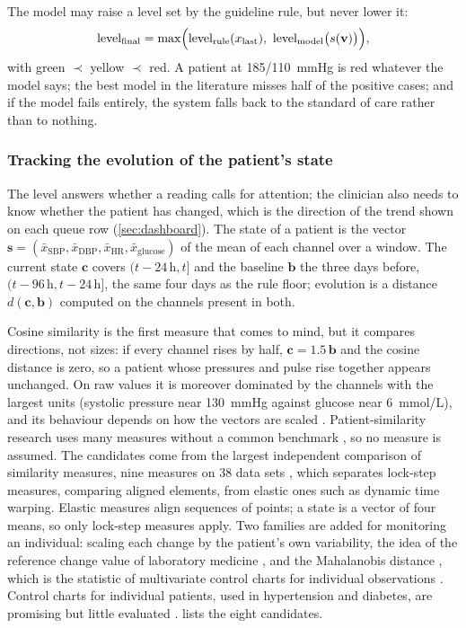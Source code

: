 The model may raise a level set by the guideline rule, but never lower it:
\begin{equation}
  \text{level}_{\text{final}} = \max\Bigl(\text{level}_{\text{rule}}(x_{\text{last}}),\ \text{level}_{\text{model}}\bigl(s(\mathbf{v})\bigr)\Bigr),
\end{equation}
with green $\prec$ yellow $\prec$ red. A patient at 185/110~mmHg is red whatever the model says; the best model in the literature misses half of the positive cases; and if the model fails entirely, the system falls back to the standard of care rather than to nothing.

\subsubsection{Tracking the evolution of the patient's state}\label{sec:state-evolution}

The level answers whether a reading calls for attention; the clinician also needs to know whether the patient has changed, which is the direction of the trend shown on each queue row (\cref{sec:dashboard}). The state of a patient is the vector $\mathbf{s} = (\bar{x}_{\text{SBP}}, \bar{x}_{\text{DBP}}, \bar{x}_{\text{HR}}, \bar{x}_{\text{glucose}})$ of the mean of each channel over a window. The current state $\mathbf{c}$ covers $(t - 24\,\text{h}, t]$ and the baseline $\mathbf{b}$ the three days before, $(t - 96\,\text{h}, t - 24\,\text{h}]$, the same four days as the rule floor; evolution is a distance $d(\mathbf{c}, \mathbf{b})$ computed on the channels present in both.

Cosine similarity is the first measure that comes to mind, but it compares directions, not sizes: if every channel rises by half, $\mathbf{c} = 1.5\,\mathbf{b}$ and the cosine distance is zero, so a patient whose pressures and pulse rise together appears unchanged. On raw values it is moreover dominated by the channels with the largest units (systolic pressure near 130~mmHg against glucose near 6~mmol/L), and its behaviour depends on how the vectors are scaled \parencite{steck2024}. Patient-similarity research uses many measures without a common benchmark \parencite{parimbelli2018,sharafoddini2017}, so no measure is assumed. The candidates come from the largest independent comparison of similarity measures, nine measures on 38 data sets \parencite{wang2013timeseries}, which separates lock-step measures, comparing aligned elements, from elastic ones such as dynamic time warping. Elastic measures align sequences of points; a state is a vector of four means, so only lock-step measures apply. Two families are added for monitoring an individual: scaling each change by the patient's own variability, the idea of the reference change value of laboratory medicine \parencite{fraser1989}, and the Mahalanobis distance \parencite{mahalanobis1936}, which is the statistic of multivariate control charts for individual observations \parencite{tracy1992}. Control charts for individual patients, used in hypertension and diabetes, are promising but little evaluated \parencite{tennant2007}.  lists the eight candidates.

